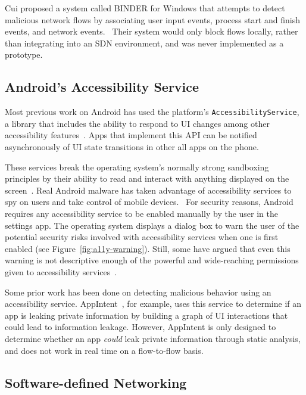 Cui \etal proposed a system called BINDER for Windows that attempts to detect
malicious network flows by associating user input events, process start and
finish events, and network events.~\cite{cui2005} Their system would only block
flows locally, rather than integrating into an SDN environment, and was never
implemented as a prototype.

\subsection{Android's Accessibility Service}
\label{sec:androids-accessibility-service}

Most previous work on Android has used the platform's
\texttt{AccessibilityService}, a library that includes the ability to respond to
UI changes among other accessibility features~\cite{googledevelopers2020}. Apps
that implement this API can be notified asynchronously of UI state transitions
in other all apps on the phone.

These services break the operating system's normally strong sandboxing
principles by their ability to read and interact with anything displayed on the
screen~\cite{kalysch2018, diao2019}. Real Android malware has taken advantage of
accessibility services to spy on users and take control of mobile
devices.~\cite{kraunelis2013} For security reasons, Android requires any
accessibility service to be enabled manually by the user in the settings app.
The operating system displays a dialog box to warn the user of the potential
security risks involved with accessibility services when one is first enabled
(see Figure~\ref{fig:a11y-warning}). Still, some have argued that even this
warning is not descriptive enough of the powerful and wide-reaching permissions
given to accessibility services~\cite{kalysch2018}.

Some prior work has been done on detecting malicious behavior using an
accessibility service. AppIntent~\cite{yang2013}, for example, uses this service
to determine if an app is leaking private information by building a graph of UI
interactions that could lead to information leakage. However, AppIntent is only
designed to determine whether an app \textit{could} leak private information
through static analysis, and does not work in real time on a flow-to-flow basis.

\subsection{Software-defined Networking}
\label{sec:software-defined-networking}

